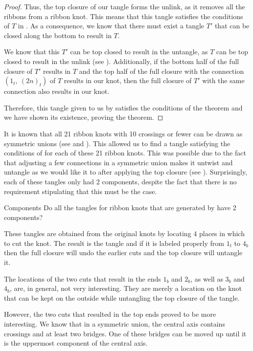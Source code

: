 \begin{paper}
\begin{proof}
Thus, the top closure of our tangle forms the unlink, as it removes all the
ribbons from a ribbon knot.
This means that this tangle satisfies the conditions of $T$ in \lemTangles.
As a consequence, we know that there must exist a tangle $T'$ that can be closed
along the bottom to result in $T$.

We know that this $T'$ can be top closed to result in the untangle, as $T$ can
be top closed to result in the unlink (see \figLemma).
Additionally, if the bottom half of the full closure of $T'$ results in $T$ and
the top half of the full closure with the connection $(1_t,~(2n)_t)$ of $T$
results in our knot, then the full closure of $T'$ with the same connection also
results in our knot.

Therefore, this tangle given to us by \lemTangles satisfies the conditions of
the theorem and we have shown its existence, proving the theorem.
\end{proof}


It is known that all 21 ribbon knots with 10 crossings or fewer can be drawn as
symmetric unions (see \cite{many} and \cite{one}).
This allowed us to find a tangle satisfying the conditions of \thmRibbon for
each of these 21 ribbon knots.
This was possible due to the fact that adjusting a few connections in a
symmetric union makes it untwist and untangle as we would like it to after
applying the top closure (see \figTop).
Surprisingly, each of these tangles only had 2 components, despite the fact that
there is no requirement stipulating that this must be the case.

\begin{paperqtn}{Components}
Do all the tangles for ribbon knots that are generated by \thmRibbon have 2
components?
\end{paperqtn}

These tangles are obtained from the original knots by locating 4 places in which
to cut the knot.
The result is the tangle and if it is labeled properly from $1_t$ to $4_b$ then
the full closure will undo the earlier cuts and the top closure will untangle it.

The locations of the two cuts that result in the ends $1_b$ and $2_b$, as well
as $3_b$ and $4_b$, are, in general, not very interesting.
They are merely a location on the knot that can be kept on the outside while
untangling the top closure of the tangle.

However, the two cuts that resulted in the top ends proved to be more
interesting.
We know that in a symmetric union, the central axis contains crossings and at
least two bridges.
One of these bridges can be moved up until it is the uppermost component of the
central axis.\newsavebox{\knotR}


\end{paper}
